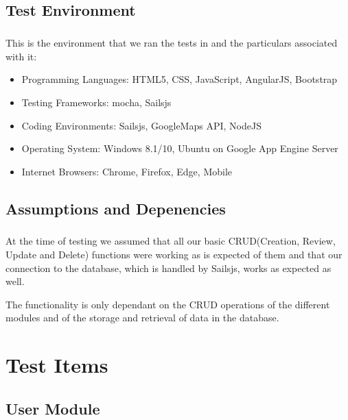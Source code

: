 \documentclass[11pt,fleqn]{book} %
\begin{document}
	\section{Test Environment}
		\paragraph{}
			This is the environment that we ran the tests in and the particulars associated with it:
			\begin{itemize}
				\item Programming Languages: HTML5, CSS, JavaScript, AngularJS, Bootstrap
				\item Testing Frameworks: mocha, Sailsjs
				\item Coding Environments: Sailsjs, GoogleMaps API, NodeJS
				\item Operating System: Windows 8.1/10, Ubuntu on Google App Engine Server
				\item Internet Browsers: Chrome, Firefox, Edge, Mobile
			\end{itemize}
	\section{Assumptions and Depenencies}
		\paragraph{}
			At the time of testing we assumed that all our basic CRUD(Creation, Review, Update and Delete) functions were working as is expected of them and that our connection to the database, which is handled by Sailsjs, works as expected as well.
			
			The functionality is only dependant on the CRUD operations of the different modules and of the storage and retrieval of data in the database.
	

\chapter{Test Items}
	\section{User Module}
\end{document}
